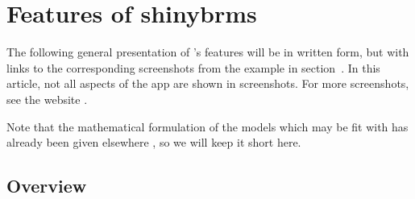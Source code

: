 \section{Features of shinybrms}
\label{feat}

The following general presentation of 's features will be in
written form, but with links to the corresponding screenshots from the example in
section~. In this article, not all aspects of the 
app are shown in screenshots. For more screenshots, see the 
website \citep{weber_shinybrms_2021}.

Note that the mathematical formulation of the models
which may be fit with  has already been given elsewhere
\citep{burkner_brms:_2017, burkner_advanced_2018}, so we will keep it short
here.

\subsection{Overview}
\label{overview}

